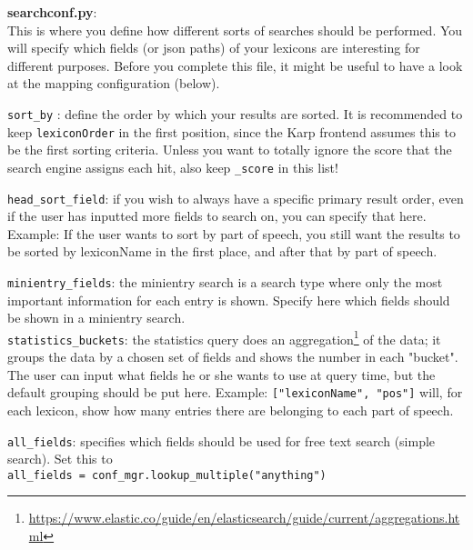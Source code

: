 \documentclass[
12pt, %
a4paper, %
oneside, %
headinclude,footinclude, %
BCOR0mm, %
]{scrartcl}
\begin{document}
\textbf{searchconf.py}:\\
   This is where you define how different sorts of searches should be performed.
   You will specify which fields (or json paths) of your lexicons are interesting
   for different purposes.
   Before you complete this file, it might be useful to have a look at the mapping
   configuration (below).

   \verb|sort_by| : define the order by which your results are sorted. It is recommended
             to keep \verb|lexiconOrder| in the first position,
             since the Karp frontend assumes this to be the first sorting criteria.
             Unless you want
             to totally ignore the score that the search
             engine assigns each hit, also keep \verb|_score| in this list!

   \verb|head_sort_field|: if you wish to always have a specific primary result order,
             even if the user has inputted more fields to search on, you can specify that
             here. Example: If the user wants to sort by part of speech, you still want
             the results to be sorted by lexiconName in the first place, and after that
             by part of speech.

   \verb|minientry_fields|: the minientry search is a search type where only the most
             important information for each entry is shown. Specify here which
             fields should be shown in a minientry search.\\
  \verb|statistics_buckets|: the statistics query does an
             aggregation\footnote{\url{https://www.elastic.co/guide/en/elasticsearch/guide/current/aggregations.html}}
             of the data; it groups the data by a chosen set of fields and shows the number in each
             "bucket".
             The user can input what fields he or she wants to use at query time, but the default
             grouping should be put here.
             Example: \verb|["lexiconName", "pos"]| will, for each lexicon, show how many
             entries there are belonging to each part of speech.

  \verb|all_fields|: specifies which fields should be used for free text search (simple search).
             Set this to \\
             \verb|all_fields = conf_mgr.lookup_multiple("anything")|
\end{document}
